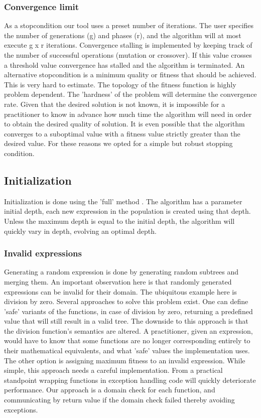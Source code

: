 \subsubsection{Convergence limit}
As a stopcondition our tool uses a preset number of iterations. The user specifies the number of generations (g) and phases (r), and the algorithm will at most execute g x r iterations. Convergence stalling is implemented by keeping track of the number of successful operations (mutation or crossover). If this value crosses a threshold value convergence has stalled and the algorithm is terminated. An alternative stopcondition is a minimum quality or fitness that should be achieved. This is very hard to estimate. The topology of the fitness function is highly problem dependent. The 'hardness' \citep{GPHardness} of the problem will determine the convergence rate. Given that the desired solution is not known, it is impossible for a practitioner to know in advance how much time the algorithm will need in order to obtain the desired quality of solution. It is even possible that the algorithm converges to a suboptimal value with a fitness value strictly greater than the desired value. For these reasons we opted for a simple but robust stopping condition.


\subsection{Initialization}
Initialization is done using the 'full' method \cite{GP}. The algorithm has a parameter initial depth, each new expression in the population is created using that depth. Unless the maximum depth is equal to the initial depth, the algorithm will quickly vary in depth, evolving an optimal depth.

\subsubsection{Invalid expressions}\label{subsubinvalidexpressions}
Generating a random expression is done by generating random subtrees and merging them. An important observation here is that randomly generated expressions can be invalid for their domain. The ubiquitous example here is division by zero. Several approaches to solve this problem exist. One can define 'safe' variants of the functions, in case of division by zero, returning a predefined value that will still result in a valid tree. The downside to this approach is that the division function's semantics are altered. A practitioner, given an expression, would have to know that some functions are no longer corresponding entirely to their mathematical equivalents, and what 'safe' values the implementation uses.
The other option is assigning maximum fitness to an invalid expression. While simple, this approach needs a careful implementation. From a practical standpoint wrapping functions in exception handling code will quickly deteriorate performance.
Our approach is a domain check for each function, and communicating by return value if the domain check failed thereby avoiding exceptions.

